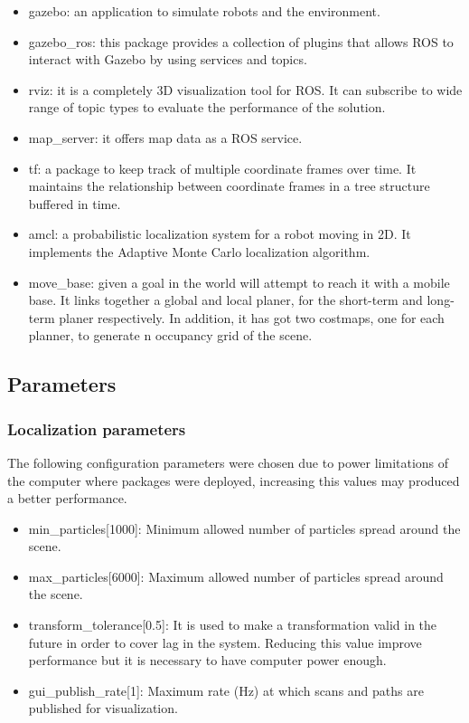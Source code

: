 \documentclass[10pt,journal,compsoc]{IEEEtran}
\begin{document}
\begin{itemize}
\item gazebo: an application to simulate robots and the environment.
\item gazebo\_ros: this package provides a collection of plugins that allows ROS to interact with Gazebo by using services and topics.
\item rviz: it is a completely 3D visualization tool for ROS. It can subscribe to wide range of topic types to evaluate the performance of the solution.
\item map\_server: it offers map data as a ROS service.
\item tf: a package to keep track of multiple coordinate frames over time. It maintains the relationship between coordinate frames in a tree structure buffered in time.
\item amcl: a probabilistic localization system for a robot moving in 2D. It implements the Adaptive Monte Carlo localization algorithm.
\item move\_base: given a goal in the world will attempt to reach it with a mobile base. It links together a global and local planer, for the short-term and long-term planer respectively. In addition, it has got two costmaps, one for each planner, to generate n occupancy grid of the scene.
\end{itemize}

\subsection{Parameters}

\subsubsection{Localization parameters}

The following configuration parameters were chosen due to power limitations of the computer where packages were deployed, increasing this values may produced a better performance.

\begin{itemize}
\item min\_particles[1000]: Minimum allowed number of particles spread around the scene.
\item max\_particles[6000]: Maximum allowed number of particles spread around the scene. 
\item transform\_tolerance[0.5]: It is used to make a transformation valid in the future in order to cover lag in the system. Reducing this value improve performance but it is necessary to have computer power enough.
\item gui\_publish\_rate[1]: Maximum rate (Hz) at which scans and paths are published for visualization.
\end{itemize}
\end{document}
